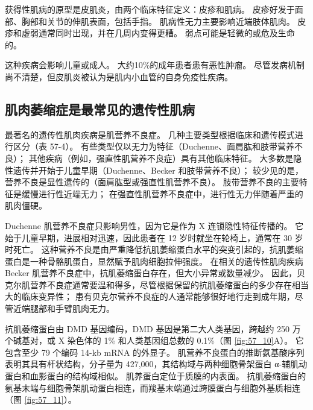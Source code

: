 获得性肌病的原型是皮肌炎，由两个临床特征定义：皮疹和肌病。 皮疹好发于面部、胸部和关节的伸肌表面，包括手指。 肌病性无力主要影响近端肢体肌肉。 皮疹和虚弱通常同时出现，并在几周内变得更糟。 弱点可能是轻微的或危及生命的。

这种疾病会影响儿童或成人。 大约10\%的成年患者患有恶性肿瘤。 尽管发病机制尚不清楚，但皮肌炎被认为是肌内小血管的自身免疫性疾病。


\subsection{肌肉萎缩症是最常见的遗传性肌病}
最著名的遗传性肌肉疾病是肌营养不良症。 几种主要类型根据临床和遗传模式进行区分（表 57-4）。 有些类型仅以无力为特征（Duchenne、面肩肱和肢带营养不良）； 其他疾病（例如，强直性肌营养不良症）具有其他临床特征。 大多数是隐性遗传并开始于儿童早期（Duchenne、Becker 和肢带营养不良）； 较少见的是，营养不良是显性遗传的（面肩肱型或强直性肌营养不良）。 肢带营养不良的主要特征是缓慢进行性近端无力； 在强直性肌营养不良症中，进行性无力伴随着严重的肌肉僵硬。

Duchenne 肌营养不良症只影响男性，因为它是作为 X 连锁隐性特征传播的。 它始于儿童早期，进展相对迅速，因此患者在 12 岁时就坐在轮椅上，通常在 30 岁时死亡。 这种营养不良是由严重降低抗肌萎缩蛋白水平的突变引起的，抗肌萎缩蛋白是一种骨骼肌蛋白，显然赋予肌肉细胞拉伸强度。 在相关的遗传性肌肉疾病 Becker 肌营养不良症中，抗肌萎缩蛋白存在，但大小异常或数量减少。 因此，贝克尔肌营养不良症通常要温和得多，尽管根据保留的抗肌萎缩蛋白的多少存在相当大的临床变异性； 患有贝克尔营养不良症的人通常能够很好地行走到成年期，尽管近端腿部和手臂肌肉无力。

抗肌萎缩蛋白由 DMD 基因编码，DMD 基因是第二大人类基因，跨越约 250 万个碱基对，或 X 染色体的 1\% 和人类基因组总数的 0.1\%（图 \ref{fig:57_10}A）。 它包含至少 79 个编码 14-kb mRNA 的外显子。 肌营养不良蛋白的推断氨基酸序列表明其具有杆状结构，分子量为 427,000，其结构域与两种细胞骨架蛋白 α-辅肌动蛋白和血影蛋白的结构域相似。 肌养蛋白定位于质膜的内表面。 抗肌萎缩蛋白的氨基末端与细胞骨架肌动蛋白相连，而羧基末端通过跨膜蛋白与细胞外基质相连（图 \ref{fig:57_11}）。

